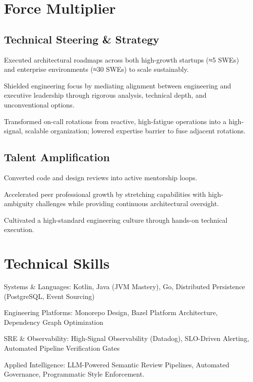 \documentclass{resume}
\begin{document}
\section{Force Multiplier}

\subsection{Technical Steering \& Strategy}
\begin{compactitem}
\item Executed architectural roadmaps across both high-growth startups (≈5 SWEs) and enterprise environments (≈30 SWEs) to scale sustainably.
\item Shielded engineering focus by mediating alignment between engineering and executive leadership through rigorous analysis, technical depth, and unconventional options. 
\item Transformed on-call rotations from reactive, high-fatigue operations into a high-signal, scalable organization; lowered expertise barrier to fuse adjacent rotations.
\end{compactitem}


\subsection{Talent Amplification}
\begin{compactitem}
\item Converted code and design reviews into active mentorship loops.
\item Accelerated peer professional growth by stretching capabilities with high-ambiguity challenges while providing continuous architectural oversight.
\item Cultivated a high-standard engineering culture through hands-on technical execution.
\end{compactitem}

\section{Technical Skills}

\begin{compactitem}
\item Systems \& Languages: Kotlin, Java (JVM Mastery), Go, Distributed Persistence (PostgreSQL, Event Sourcing)
\item Engineering Platforms: Monorepo Design, Bazel Platform Architecture, Dependency Graph Optimization
\item SRE \& Observability: High-Signal Observability (Datadog), SLO-Driven Alerting, Automated Pipeline Verification Gates
\item Applied Intelligence: LLM-Powered Semantic Review Pipelines, Automated Governance, Programmatic Style Enforcement.
\end{compactitem}
\end{document}
